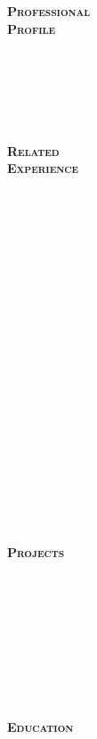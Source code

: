\documentclass[10pt]{article}
\begin{document}
\begin{minipage}[t]{0.16\linewidth} 
	\textbf{\textsc{
	\hspace{-5pt}Professional\\Profile \\ \\ \\ \\ \\ \\ \\
	Related\\Experience \\ \\ \\ \\ \\ \\ \\ \\ \\ \\ \\ \\ \\ \\ \\ \\ \\ \\ \\ \\ \\ \\
	Projects \\ \\ \\ \\ \\ \\ \\ \\ \\ \\
	Education
	}}
\end{minipage}
\end{document}
